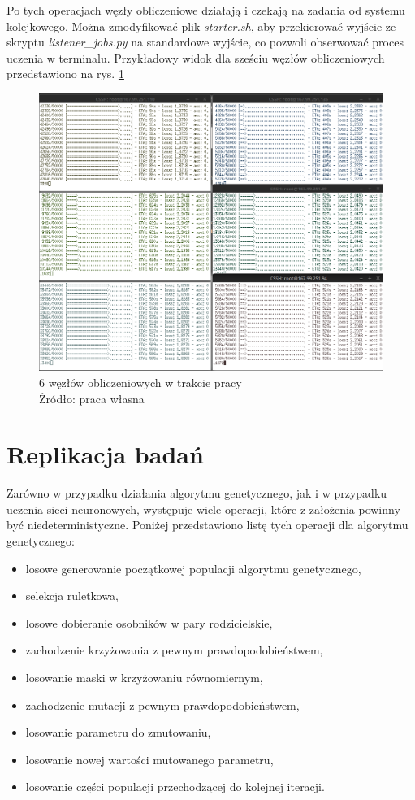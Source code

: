 Po tych operacjach węzły obliczeniowe działają i czekają na zadania od systemu kolejkowego.
Można zmodyfikować plik \textit{starter.sh}, aby przekierować wyjście ze skryptu \textit{listener\_jobs.py} na standardowe wyjście, co pozwoli obserwować proces uczenia w terminalu.
Przykładowy widok dla sześciu węzłów obliczeniowych przedstawiono na rys. \ref{fig:wip}

\begin{figure}[h!tb]
	 \centering
	 \includegraphics[width = 1.0\linewidth]{img/wip}
	 \caption{6 węzłów obliczeniowych w trakcie pracy \\
              Źródło: praca własna}
	 \label{fig:wip}
\end{figure}

\section{Replikacja badań}\label{sec:replicativity}
Zarówno w przypadku działania algorytmu genetycznego, jak i w przypadku uczenia sieci neuronowych, występuje wiele operacji, które z założenia powinny być niedeterministyczne.
Poniżej przedstawiono listę tych operacji dla algorytmu genetycznego:
\begin{itemize}
  \item losowe generowanie początkowej populacji algorytmu genetycznego,
  \item selekcja ruletkowa,
  \item losowe dobieranie osobników w pary rodzicielskie,
  \item zachodzenie krzyżowania z pewnym prawdopodobieństwem,
  \item losowanie maski w krzyżowaniu równomiernym,
  \item zachodzenie mutacji z pewnym prawdopodobieństwem,
  \item losowanie parametru do zmutowaniu,
  \item losowanie nowej wartości mutowanego parametru,
  \item losowanie części populacji przechodzącej do kolejnej iteracji.
\end{itemize}

